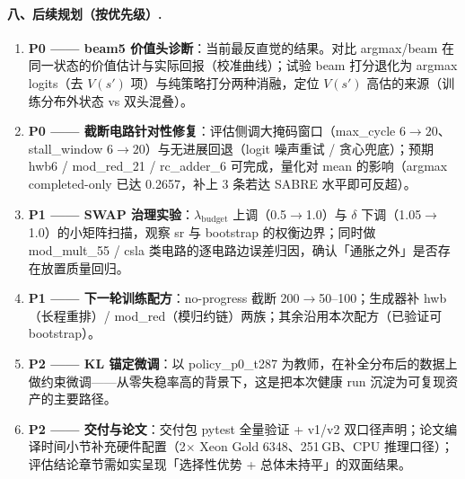 \paragraph{八、后续规划（按优先级）.}
\begin{enumerate}
    \item \textbf{P0 —— beam5 价值头诊断}：当前最反直觉的结果。对比 argmax/beam 在同一状态的价值估计与实际回报（校准曲线）；试验 beam 打分退化为 argmax logits（去 $V(s')$ 项）与纯策略打分两种消融，定位 $V(s')$ 高估的来源（训练分布外状态 vs 双头混叠）。
    \item \textbf{P0 —— 截断电路针对性修复}：评估侧调大掩码窗口（max\_cycle $6\to20$、stall\_window $6\to20$）与无进展回退（logit 噪声重试 / 贪心兜底）；预期 hwb6 / mod\_red\_21 / rc\_adder\_6 可完成，量化对 mean 的影响（argmax completed-only 已达 0.2657，补上 3 条若达 SABRE 水平即可反超）。
    \item \textbf{P1 —— SWAP 治理实验}：$\lambda_{\mathrm{budget}}$ 上调（0.5$\to$1.0）与 $\delta$ 下调（1.05$\to$1.0）的小矩阵扫描，观察 sr 与 bootstrap 的权衡边界；同时做 mod\_mult\_55 / csla 类电路的逐电路边误差归因，确认「通胀之外」是否存在放置质量回归。
    \item \textbf{P1 —— 下一轮训练配方}：no-progress 截断 200$\to$50--100；生成器补 hwb（长程重排）/ mod\_red（模归约链）两族；其余沿用本次配方（已验证可 bootstrap）。
    \item \textbf{P2 —— KL 锚定微调}：以 policy\_p0\_t287 为教师，在补全分布后的数据上做约束微调——从零失稳率高的背景下，这是把本次健康 run 沉淀为可复现资产的主要路径。
    \item \textbf{P2 —— 交付与论文}：交付包 pytest 全量验证 + v1/v2 双口径声明；论文编译时间小节补充硬件配置（2$\times$ Xeon Gold 6348、251\,GB、CPU 推理口径）；评估结论章节需如实呈现「选择性优势 + 总体未持平」的双面结果。
\end{enumerate}
